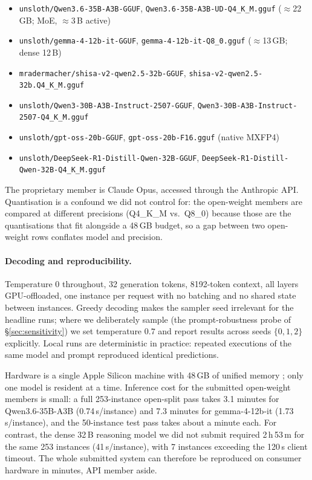 \begin{itemize}\itemsep2pt
\item \texttt{unsloth/Qwen3.6-35B-A3B-GGUF},
      \texttt{Qwen3.6-35B-A3B-UD-Q4\_K\_M.gguf} ($\approx$22\,GB; MoE,
      $\approx$3\,B active)
\item \texttt{unsloth/gemma-4-12b-it-GGUF},
      \texttt{gemma-4-12b-it-Q8\_0.gguf} ($\approx$13\,GB; dense 12\,B)
\item \texttt{mradermacher/shisa-v2-qwen2.5-32b-GGUF},
      \texttt{shisa-v2-qwen2.5-32b.Q4\_K\_M.gguf}
\item \texttt{unsloth/Qwen3-30B-A3B-Instruct-2507-GGUF},
      \texttt{Qwen3-30B-A3B-Instruct-2507-Q4\_K\_M.gguf}
\item \texttt{unsloth/gpt-oss-20b-GGUF},
      \texttt{gpt-oss-20b-F16.gguf} (native MXFP4)
\item \texttt{unsloth/DeepSeek-R1-Distill-Qwen-32B-GGUF},
      \texttt{DeepSeek-R1-Distill-Qwen-32B-Q4\_K\_M.gguf}
\end{itemize}

\noindent
The proprietary member is Claude Opus, accessed through the Anthropic
API. 
Quantisation is a confound we did not control for: the open-weight
members are compared at different precisions (Q4\_K\_M vs.\ Q8\_0)
because those are the quantisations that fit alongside a 48\,GB budget,
so a gap between two open-weight rows conflates model and precision.

\paragraph{Decoding and reproducibility.}
Temperature $0$ throughout, 32 generation tokens, 8192-token context,
all layers GPU-offloaded, one instance per request with no batching and
no shared state between instances. Greedy decoding makes the sampler
seed irrelevant for the headline runs; where we deliberately sample
(the prompt-robustness probe of \S\ref{sec:sensitivity}) we set
temperature $0.7$ and report results across seeds $\{0,1,2\}$
explicitly. Local runs are deterministic in practice: repeated
executions of the same model and prompt reproduced identical
predictions.

Hardware is a single Apple Silicon machine with 48\,GB of unified
memory ; only one model is resident at a time.
Inference cost for the submitted open-weight members is small: a full
253-instance open-split pass takes 3.1 minutes for Qwen3.6-35B-A3B
(0.74\,s/instance) and 7.3 minutes for gemma-4-12b-it
(1.73\,s/instance), and the 50-instance test pass takes about a minute
each. For contrast, the dense 32\,B reasoning model we did not submit
required 2\,h\,53\,m for the same 253 instances (41\,s/instance), with
7 instances exceeding the 120\,s client timeout. The whole submitted
system can therefore be reproduced on consumer hardware in minutes, API
member aside.

